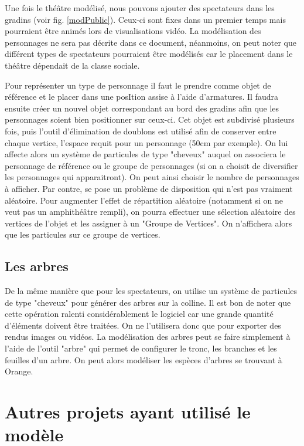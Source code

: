 Une fois le théâtre modélisé, nous pouvons ajouter des spectateurs dans les gradins (voir fig. \ref{modPublic}). Ceux-ci sont fixes dans un premier temps mais pourraient être animés lors de visualisations vidéo. La modélisation des personnages ne sera pas décrite dans ce document, néanmoins, on peut noter que différent types de spectateurs pourraient être modélisés car le placement dans le théâtre dépendait de la classe sociale.

Pour représenter un type de personnage il faut le prendre comme objet de référence et le placer dans une posItion assise à l'aide d'\glspl{armature}. Il faudra ensuite créer un nouvel objet correspondant au bord des gradins afin que les personnages soient bien positionner sur ceux-ci. Cet objet est subdivisé plusieurs fois, puis l'outil d'élimination de doublons est utilisé afin de conserver entre chaque vertice, l'espace requit pour un personnage (50cm par exemple). On lui affecte alors un système de \glspl{particule} de type "cheveux" auquel on associera le personnage de référence ou le groupe de personnages (si on a choisit de diversifier les personnages qui apparaitront). On peut ainsi choisir le nombre de personnages à afficher. Par contre, se pose un problème de disposition qui n'est pas vraiment aléatoire. Pour augmenter l'effet de répartition aléatoire (notamment si on ne veut pas un amphithéâtre rempli), on pourra effectuer une sélection aléatoire des vertices de l'objet et les assigner à un "Groupe de Vertices". On n'affichera alors que les particules sur ce groupe de vertices. 


\subsection{Les arbres}
De la même manière que pour les spectateurs, on utilise un système de \glspl{particule} de type "cheveux" pour générer des arbres sur la colline. Il est bon de noter que cette opération ralenti considérablement le logiciel car une grande quantité d'éléments doivent être traitées. On ne l'utilisera donc que pour exporter des rendus images ou vidéos. La modélisation des arbres peut se faire simplement à l'aide de l'outil "arbre" qui permet de configurer le tronc, les branches et les feuilles d'un arbre. On peut alors modéliser les espèces d'arbres se trouvant à Orange.


\section{Autres projets ayant utilisé le modèle}
\label{sect-autres}

